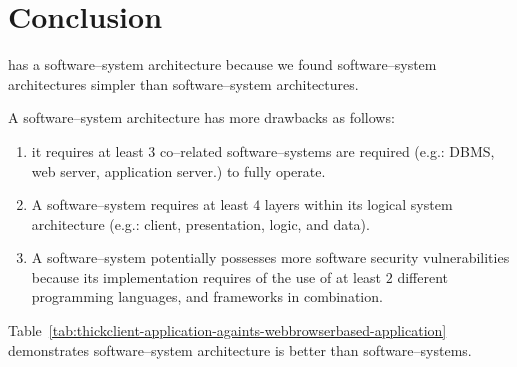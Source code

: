 \chapter{Conclusion}

\yerotherpblack has a \thickclient
software--system architecture because we
found \thickclient software--system
architectures simpler than \webbrowserbased
software--system architectures.

A \webbrowserbased software--system
architecture has more drawbacks as
follows:

\begin{enumerate}[1)]
	\item it requires at least $3$ co--related 
		software--systems are required 
		(e.g.: DBMS, web server, application server.)
		to fully operate.
		
	\item A \webbrowserbased software--system
		requires at least $4$ layers within
		its logical system architecture
		(e.g.: client, presentation, logic, and data).

	\item A \webbrowserbased software--system
		potentially possesses more software
		security vulnerabilities because its
		implementation requires of the use of
		at least $2$ different programming 
		languages, and frameworks in combination.
\end{enumerate}

Table~\ref{tab:thickclient-application-againts-webbrowserbased-application}
demonstrates \thickclient software--system architecture
is better than \webbrowserbased software--systems.